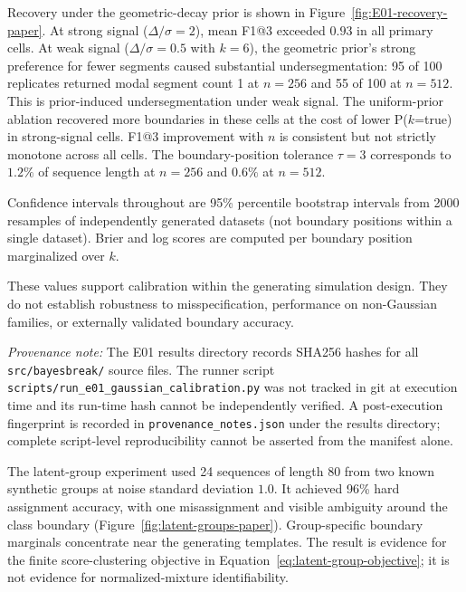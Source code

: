 Recovery under the geometric-decay prior is shown in Figure~\ref{fig:E01-recovery-paper}. At strong signal ($\Delta/\sigma=2$), mean F1@3 exceeded $0.93$ in all primary cells. At weak signal ($\Delta/\sigma=0.5$ with $k=6$), the geometric prior's strong preference for fewer segments caused substantial undersegmentation: 95 of 100 replicates returned modal segment count 1 at $n=256$ and 55 of 100 at $n=512$. This is prior-induced undersegmentation under weak signal. The uniform-prior ablation recovered more boundaries in these cells at the cost of lower P($k$=true) in strong-signal cells. F1@3 improvement with $n$ is consistent but not strictly monotone across all cells. The boundary-position tolerance $\tau=3$ corresponds to $1.2\%$ of sequence length at $n=256$ and $0.6\%$ at $n=512$.

Confidence intervals throughout are 95\% percentile bootstrap intervals from 2000 resamples of independently generated datasets (not boundary positions within a single dataset). Brier and log scores are computed per boundary position marginalized over $k$.

These values support calibration within the generating simulation design. They do not establish robustness to misspecification, performance on non-Gaussian families, or externally validated boundary accuracy.

\textit{Provenance note:} The E01 results directory records SHA256 hashes for all \texttt{src/bayesbreak/} source files. The runner script \texttt{scripts/run\_e01\_gaussian\_calibration.py} was not tracked in git at execution time and its run-time hash cannot be independently verified. A post-execution fingerprint is recorded in \texttt{provenance\_notes.json} under the results directory; complete script-level reproducibility cannot be asserted from the manifest alone.







The latent-group experiment used 24 sequences of length 80 from two known synthetic groups at noise standard deviation $1.0$. It achieved 96\% hard assignment accuracy, with one misassignment and visible ambiguity around the class boundary (Figure~\ref{fig:latent-groups-paper}). Group-specific boundary marginals concentrate near the generating templates. The result is evidence for the finite score-clustering objective in Equation~\eqref{eq:latent-group-objective}; it is not evidence for normalized-mixture identifiability.

